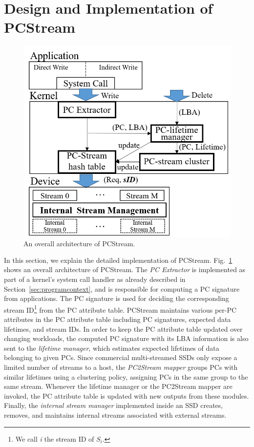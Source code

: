 \section{Design and Implementation of \textsf{PCStream}}

\begin{figure}[t]
	\centering
	\includegraphics[width=0.8\linewidth]{figure/overview}
	\caption{
		An overall architecture of \textsf{\small PCStream}. 
	}
	\label{fig:architecture}
	\vspace{-22pt}
\end{figure}


In this section, we explain the detailed implementation of \textsf{\small
PCStream}.  Fig.~\ref{fig:architecture} shows an overall architecture of
\textsf{\small PCStream}. The \textit{PC Extractor} is implemented as
part of a kernel's system call handler as already described in
Section~\ref{sec:programcontext}, and is responsible for computing a PC signature
from applications.  
{\color{blue}
The PC signature is used for deciding the corresponding stream ID\footnote{
We call {\it i} the stream ID of $S_i$.} from the PC attribute table.
PCStream maintains various per-PC attributes in the PC attribute table
including PC signatures, expected data lifetimes, and stream IDs.
In order to keep the PC attribute table updated over changing workloads,
the computed PC signature with its LBA information is also sent to the 
{\it lifetime manager}, which 
}
estimates expected lifetimes of data belonging to given PCs.
Since commercial multi-streamed SSDs only expose a limited number of streams to a host, 
the \textit{PC2Stream mapper} groups PCs with similar lifetimes using a clustering
policy, assigning PCs in the same group to the same stream.  
{\color{blue}
Whenever the lifetime manager or the PC2Stream mapper are invoked,
the PC attribute table is updated with new outputs from these modules.
}
Finally, the
\textit{internal stream manager} implemented inside an SSD creates, removes,
and maintains internal streams associated with external streams.

